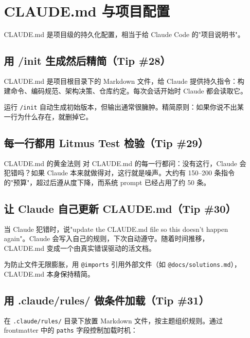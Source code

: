 \section{CLAUDE.md 与项目配置}

CLAUDE.md 是项目级的持久化配置，相当于给 Claude Code 的"项目说明书"。

\subsection{用 /init 生成然后精简（Tip \#28）}

CLAUDE.md 是项目根目录下的 Markdown 文件，给 Claude 提供持久指令：构建命令、编码规范、架构决策、仓库约定。每次会话开始时 Claude 都会读取它。

运行 \texttt{/init} 自动生成初始版本，但输出通常很臃肿。精简原则：如果你说不出某一行为什么存在，就删掉它。

\subsection{每一行都用 Litmus Test 检验（Tip \#29）}

\begin{importantbox}{CLAUDE.md 的黄金法则}
对 CLAUDE.md 的每一行都问：没有这行，Claude 会犯错吗？如果 Claude 本来就做得对，这行就是噪声。大约有 150--200 条指令的"预算"，超过后遵从度下降，而系统 prompt 已经占用了约 50 条。
\end{importantbox}

\subsection{让 Claude 自己更新 CLAUDE.md（Tip \#30）}

当 Claude 犯错时，说"update the CLAUDE.md file so this doesn't happen again"。Claude 会写入自己的规则，下次自动遵守。随着时间推移，CLAUDE.md 变成一个由真实错误驱动的活文档。

为防止文件无限膨胀，用 \texttt{@imports} 引用外部文件（如 \texttt{@docs/solutions.md}），CLAUDE.md 本身保持精简。

\subsection{用 .claude/rules/ 做条件加载（Tip \#31）}

在 \texttt{.claude/rules/} 目录下放置 Markdown 文件，按主题组织规则。通过 frontmatter 中的 \texttt{paths} 字段控制加载时机：

